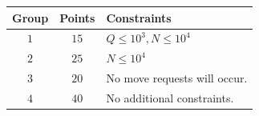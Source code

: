
\begin{center}
\begin{tabular}{| c | c | l |}
  \hline
  \textbf{Group} & \textbf{Points} & \textbf{Constraints} \\ \hline
  $1$    & $15$  & $Q \le 10^3, N \le 10^4$ \\ \hline
  $2$    & $25$  & $N \le 10^4$ \\ \hline
  $3$    & $20$  & No move requests will occur. \\ \hline
  $4$    & $40$  & No additional constraints. \\
\end{tabular}
\end{center}
